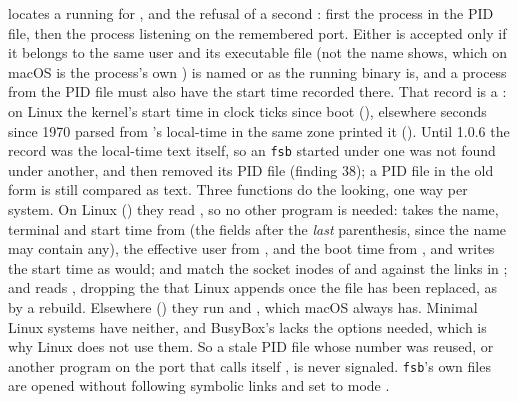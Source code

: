 locates a running  for ,  and
the refusal of a second : first the process in the PID file, then
the process listening on the remembered port.  Either is accepted only if it
belongs to the same user and its executable file (not the name  shows, which on
macOS is the process's own ) is named  or as the running binary
is, and a process from the PID file must also have the start time recorded there.  That
record is a : on Linux the kernel's start time in clock ticks since boot
(), elsewhere seconds since 1970 parsed from 's local-time
 in the same zone  printed it ().  Until 1.0.6 the
record was the local-time text itself, so an \texttt{fsb} started under one 
was not found under another, and  then removed its PID file (finding 38);
a PID file in the old form is still compared as text.
Three functions do the looking, one way per system.  On Linux ()
they read , so no other program is needed:  takes the
name, terminal and start time from  (the fields after the
\emph{last} parenthesis, since the name may contain any), the effective user from
, and the boot time from , and writes the start
time as  would;  and  match the socket
inodes of  and  against the links in
; and  reads , dropping the
 that Linux appends once the file has been replaced, as by a rebuild.
Elsewhere () they run  and , which macOS
always has.  Minimal Linux systems have neither, and BusyBox's  lacks the
options needed, which is why Linux does not use them.  So a stale PID file whose number was reused, or another
program on the port that calls itself , is never signaled.  \texttt{fsb}'s own
files are opened without following symbolic links and set to mode .
